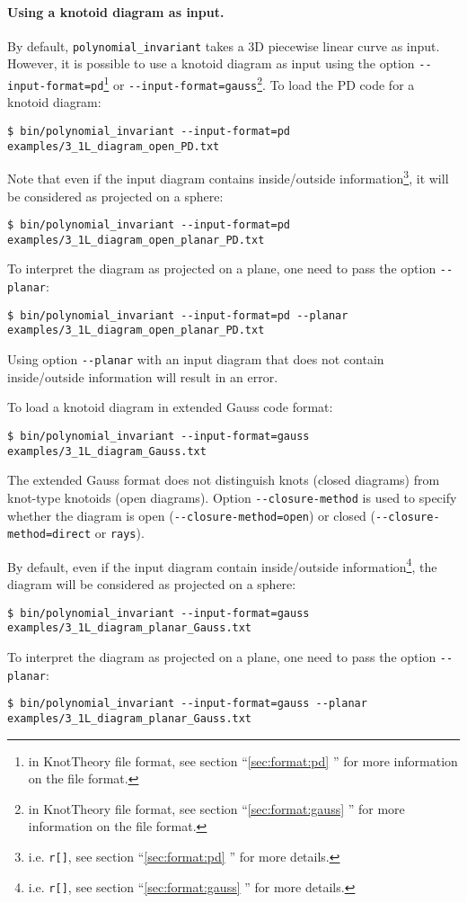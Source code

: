 \paragraph{Using a knotoid diagram as input.}
By default, \lstinline{polynomial_invariant} takes a 3D piecewise linear curve as input. However, it is possible to use a knotoid diagram as input using the option \lstinline{--input-format=pd}\footnote{in KnotTheory file format, see section ``\ref{sec:format:pd} '' for more information on the file format.} or  \lstinline{--input-format=gauss}\footnote{in KnotTheory file format, see section ``\ref{sec:format:gauss} '' for more information on the file format.}. To load the PD code for a knotoid diagram:
\begin{lstlisting}
$ bin/polynomial_invariant --input-format=pd examples/3_1L_diagram_open_PD.txt
\end{lstlisting}

Note that even if the input diagram contains inside/outside information\footnote{i.e. \lstinline{r[]}, see section ``\ref{sec:format:pd} '' for more details.}, it will be considered as projected on a sphere:
\begin{lstlisting}
$ bin/polynomial_invariant --input-format=pd examples/3_1L_diagram_open_planar_PD.txt
\end{lstlisting}
To interpret the diagram as projected on a plane, one need to pass the option \lstinline{--planar}: 
\begin{lstlisting}
$ bin/polynomial_invariant --input-format=pd --planar examples/3_1L_diagram_open_planar_PD.txt
\end{lstlisting}

Using option \lstinline{--planar} with an input diagram that does not contain inside/outside information will result in an error.

To load a knotoid diagram in extended Gauss code format:
\begin{lstlisting}
$ bin/polynomial_invariant --input-format=gauss examples/3_1L_diagram_Gauss.txt
\end{lstlisting}
The extended Gauss format does not distinguish knots (closed diagrams) from knot-type knotoids (open diagrams).
Option \lstinline{--closure-method} is used to specify whether the diagram is open (\lstinline{--closure-method=open}) or closed (\lstinline{--closure-method=direct} or \lstinline{rays}).

By default, even if the input diagram contain inside/outside information\footnote{i.e. \lstinline{r[]}, see section ``\ref{sec:format:gauss} '' for more details.}, the diagram will be considered as projected on a sphere:
\begin{lstlisting}
$ bin/polynomial_invariant --input-format=gauss examples/3_1L_diagram_planar_Gauss.txt
\end{lstlisting}
To interpret the diagram as projected on a plane, one need to pass the option \lstinline{--planar}: 
\begin{lstlisting}
$ bin/polynomial_invariant --input-format=gauss --planar examples/3_1L_diagram_planar_Gauss.txt
\end{lstlisting}

